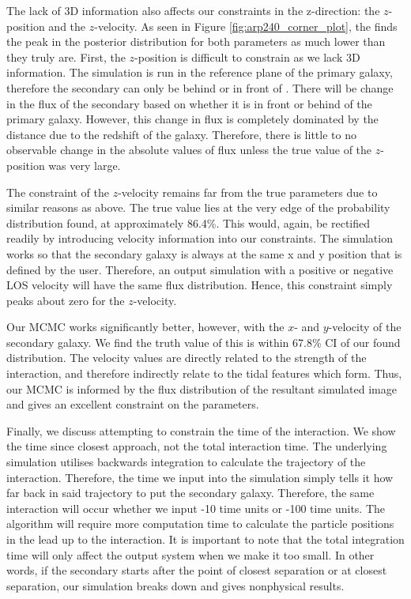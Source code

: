 The lack of 3D information also affects our constraints in the z-direction: the $z$-position and the $z$-velocity. As seen in Figure \ref{fig:arp240_corner_plot}, the finds the peak in the posterior distribution for both parameters as much lower than they truly are. First, the $z$-position is difficult to constrain as we lack 3D information. The simulation is run in the reference plane of the primary galaxy, therefore the secondary can only be behind or in front of \DIFdelbegin {}\DIFdelend \DIFaddbegin {}\DIFaddend . There will be change in the flux of the secondary based on whether it is in front or behind of the primary galaxy. However, this change in flux is completely dominated by the distance due to the redshift of the galaxy. Therefore, there is little to no observable change in the absolute values of flux unless the true value of the $z$-position was very large.

The constraint of the $z$-velocity remains far from the true parameters due to similar reasons as above. The true value lies at the very edge of the probability distribution found, at approximately 86.4\%. This would, again, be rectified readily by introducing velocity information into our constraints. The simulation works so that the secondary galaxy is always at the same x and y position that is defined by the user. Therefore, an output simulation with a positive or negative LOS velocity will have the same flux distribution. Hence, this constraint simply peaks about zero for the $z$-velocity.

Our MCMC works significantly better, however, with the $x$- and $y$-velocity of the secondary galaxy. We find the truth value of this is within 67.8\% CI of our found distribution. The velocity values are directly related to the strength of the interaction, and therefore indirectly relate to the tidal features which form. Thus, our MCMC is informed by the flux distribution of the resultant simulated image and gives an excellent constraint on the parameters.

Finally, we discuss attempting to constrain the time of the interaction. We show the time since closest approach, not the total interaction time. The underlying simulation utilises backwards integration to calculate the trajectory of the interaction. Therefore, the time we input into the simulation simply tells it how far back in said trajectory to put the secondary galaxy. Therefore, the same interaction will occur whether we input -10 time units or -100 time units. The algorithm will require more computation time to calculate the particle positions in the lead up to the interaction. It is important to note that the total integration time will only affect the output system when we make it too small. In other words, if the secondary starts after the point of closest separation or at closest separation, our simulation breaks down and gives nonphysical results.

